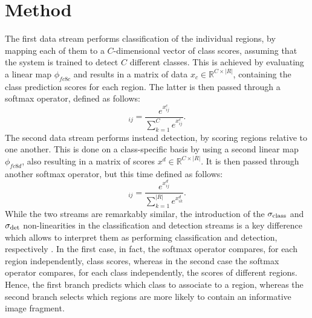 \documentclass[10pt,twocolumn,letterpaper]{article}
\begin{document}
\section{Method}
The first data stream performs classification of the individual regions, by mapping each of them to a $C$-dimensional vector of class scores, assuming that the system is trained to detect $C$ different classes. This is achieved by evaluating a linear map $\phi_{fc8c}$ and results in a matrix of data $x_c\in\mathbb{R}^{C\times |R|}$, containing the class prediction scores for each region. The latter is then passed through a softmax operator, defined as follows:
\begin{equation}
[\sigma_{\rm{class}}(x^c)]_{ij}=\frac{e^{x^c_{ij}}}{\sum_{k=1}^Ce^{x^c_{ij}}}.
\end{equation}
The second data stream performs instead detection, by scoring regions relative to one another. This is done on a class-specific basis by using a second linear map $\phi_{fc8d}$, also resulting in a matrix of scores $x^d\in\mathbb{R}^{C\times |R|}$. It is then passed through another softmax operator, but this time defined as follows:
\begin{equation}
[\sigma_{\rm{det}}(x^d)]_{ij}=\frac{e^{x^d_{ij}}}{\sum_{k=1}^{|R|}e^{x^d_{ik}}}.
\end{equation}
While the two streams are remarkably similar, the introduction of the $\sigma_{\rm{class}}$ and $\sigma_{\rm{det}}$ non-linearities in the classification and detection streams is a key difference which allows to interpret them as performing classification and detection, respectively \cite{Cinbis2017Weakly}. In the first case, in fact, the softmax operator compares, for each region independently, class scores, whereas in the second case the softmax operator compares, for each class independently, the scores of different regions. Hence, the first branch predicts which class to associate to a region, whereas the second branch selects which regions are more likely to contain an informative image fragment.
\end{document}
